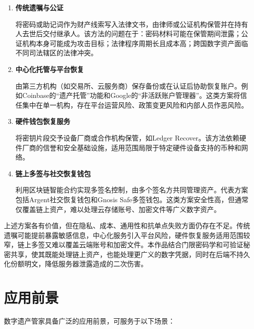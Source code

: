 \documentclass[UTF8,a4paper,zihao=-4,openany]{ctexrep}
\newcommand{\project}{数字遗产管家}
\begin{document}
\begin{enumerate}
  \item \textbf{传统遗嘱与公证}

  将密码或助记词作为财产线索写入法律文书，由律师或公证机构保管并在持有人去世后交付继承人。该方法的问题在于：密码材料可能在保管期间泄露；公证机构本身可能成为攻击目标；法律程序周期长且成本高；跨国数字资产面临不同司法辖区的法律冲突。

  \item \textbf{中心化托管与平台恢复}

  由第三方机构（如交易所、云服务商）保存备份或在认证后协助恢复账户。例如Coinbase的“遗产托管”功能和Google的“非活跃账户管理器”。这类方案将信任集中在单一机构，存在平台运营风险、政策变更风险和内部人员作恶风险。

  \item \textbf{硬件钱包恢复服务}

  将密钥片段交予设备厂商或合作机构保管，如Ledger Recover。该方法依赖硬件厂商的信誉和安全基础设施，适用范围局限于特定硬件设备支持的币种和网络。

  \item \textbf{链上多签与社交恢复钱包}

  利用区块链智能合约实现多签名控制，由多个签名方共同管理资产。代表方案包括Argent社交恢复钱包和Gnosis Safe多签钱包。这类方案安全性高，但通常仅覆盖链上资产，难以处理云存储账号、加密文件等广义数字资产。
\end{enumerate}

上述方案各有价值，但在隐私、成本、通用性和抗单点失败方面仍存在不足。传统遗嘱可能提前暴露敏感信息，中心化服务引入平台风险，硬件恢复服务适用范围较窄，链上多签又难以覆盖云端账号和加密文件。本作品结合门限密码学和可验证秘密共享，使其既能处理链上资产，也能处理更广义的数字凭据，同时在后端不持久化份额明文，降低服务器泄露造成的二次伤害。

\section{应用前景}

\project 具备广泛的应用前景，可服务于以下场景：
\end{document}

